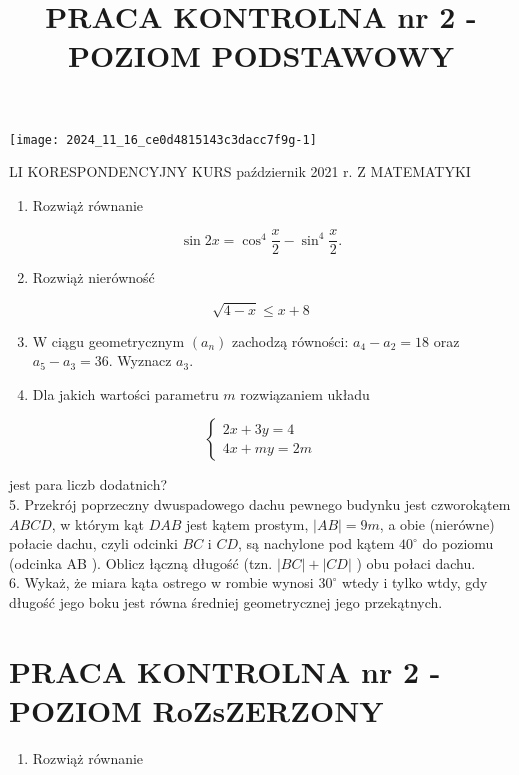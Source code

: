 \documentclass[10pt]{article}
\title{PRACA KONTROLNA nr 2 - POZIOM PODSTAWOWY }
\author{}
\date{}
\begin{document}
\maketitle
\begin{center}
\texttt{[image: 2024\_11\_16\_ce0d4815143c3dacc7f9g-1]}
\end{center}

LI KORESPONDENCYJNY KURS październik 2021 r. Z MATEMATYKI

\begin{enumerate}
  \item Rozwiąż równanie
\end{enumerate}

$$
\sin 2 x=\cos ^{4} \frac{x}{2}-\sin ^{4} \frac{x}{2} .
$$

\begin{enumerate}
  \setcounter{enumi}{1}
  \item Rozwiąż nierówność
\end{enumerate}

$$
\sqrt{4-x} \leqslant x+8
$$

\begin{enumerate}
  \setcounter{enumi}{2}
  \item W ciągu geometrycznym $\left(a_{n}\right)$ zachodzą równości: $a_{4}-a_{2}=18$ oraz $a_{5}-a_{3}=36$. Wyznacz $a_{3}$.
  \item Dla jakich wartości parametru $m$ rozwiązaniem układu
\end{enumerate}

$$
\left\{\begin{array}{l}
2 x+3 y=4 \\
4 x+m y=2 m
\end{array}\right.
$$

jest para liczb dodatnich?\\
5. Przekrój poprzeczny dwuspadowego dachu pewnego budynku jest czworokątem $A B C D$, w którym kąt $D A B$ jest kątem prostym, $|A B|=9 m$, a obie (nierówne) połacie dachu, czyli odcinki $B C$ i $C D$, są nachylone pod kątem $40^{\circ}$ do poziomu (odcinka AB ). Oblicz łączną długość (tzn. $|B C|+|C D|$ ) obu połaci dachu.\\
6. Wykaż, że miara kąta ostrego w rombie wynosi $30^{\circ}$ wtedy i tylko wtdy, gdy długość jego boku jest równa średniej geometrycznej jego przekątnych.

\section*{PRACA KONTROLNA nr 2 - POZIOM RoZsZERZONY}
\begin{enumerate}
  \item Rozwiąż równanie
\end{enumerate}
\end{document}
